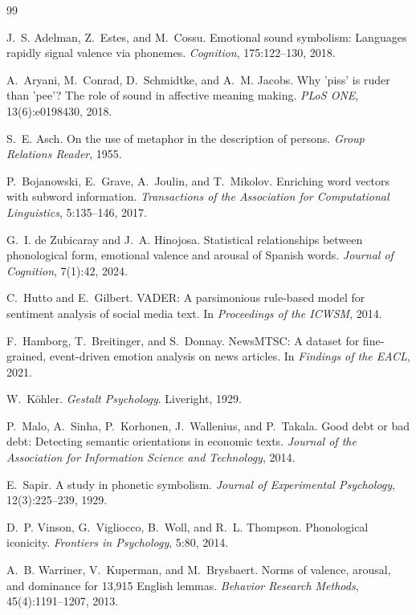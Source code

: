 \documentclass{article}
\begin{document}
\begin{thebibliography}{99}

J.~S. Adelman, Z.~Estes, and M.~Cossu.
\newblock Emotional sound symbolism: Languages rapidly signal valence via phonemes.
\newblock \emph{Cognition}, 175:122--130, 2018.

A.~Aryani, M.~Conrad, D.~Schmidtke, and A.~M. Jacobs.
\newblock Why 'piss' is ruder than 'pee'? The role of sound in affective meaning making.
\newblock \emph{PLoS ONE}, 13(6):e0198430, 2018.

S.~E. Asch.
\newblock On the use of metaphor in the description of persons.
\newblock \emph{Group Relations Reader}, 1955.

P.~Bojanowski, E.~Grave, A.~Joulin, and T.~Mikolov.
\newblock Enriching word vectors with subword information.
\newblock \emph{Transactions of the Association for Computational Linguistics}, 5:135--146, 2017.

G.~I. de Zubicaray and J.~A. Hinojosa.
\newblock Statistical relationships between phonological form, emotional valence and arousal of Spanish words.
\newblock \emph{Journal of Cognition}, 7(1):42, 2024.

C.~Hutto and E.~Gilbert.
\newblock VADER: A parsimonious rule-based model for sentiment analysis of social media text.
\newblock In \emph{Proceedings of the ICWSM}, 2014.

F.~Hamborg, T.~Breitinger, and S.~Donnay.
\newblock NewsMTSC: A dataset for fine-grained, event-driven emotion analysis on news articles.
\newblock In \emph{Findings of the EACL}, 2021.

W.~Köhler.
\newblock \emph{Gestalt Psychology}.
\newblock Liveright, 1929.

P.~Malo, A.~Sinha, P.~Korhonen, J.~Wallenius, and P.~Takala.
\newblock Good debt or bad debt: Detecting semantic orientations in economic texts.
\newblock \emph{Journal of the Association for Information Science and Technology}, 2014.

E.~Sapir.
\newblock A study in phonetic symbolism.
\newblock \emph{Journal of Experimental Psychology}, 12(3):225--239, 1929.

D.~P. Vinson, G.~Vigliocco, B.~Woll, and R.~L. Thompson.
\newblock Phonological iconicity.
\newblock \emph{Frontiers in Psychology}, 5:80, 2014.

A.~B. Warriner, V.~Kuperman, and M.~Brysbaert.
\newblock Norms of valence, arousal, and dominance for 13,915 English lemmas.
\newblock \emph{Behavior Research Methods}, 45(4):1191--1207, 2013.

\end{thebibliography}
\end{document}
